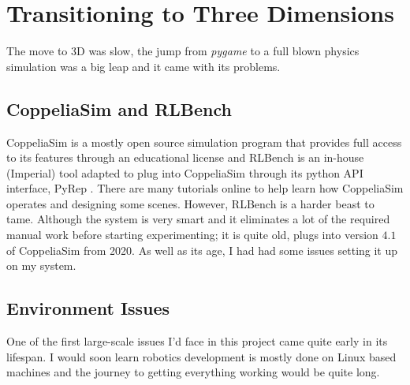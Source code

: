 \section{Transitioning to Three Dimensions}
The move to 3D was slow, the jump from \emph{pygame} to a full blown physics simulation was a big leap and it came with its problems.

\subsection{CoppeliaSim and RLBench}

CoppeliaSim is a mostly open source simulation program that provides full access to its features through an educational license and RLBench \cite{james2019rlbenchrobotlearningbenchmark} is an in-house (Imperial) tool adapted to plug into CoppeliaSim through its python API interface, PyRep \cite{pyrep2020}. There are many tutorials online to help learn how CoppeliaSim operates and designing some scenes. However, RLBench is a harder beast to tame. Although the system is very smart and it eliminates a lot of the required manual work before starting experimenting; it is quite old, plugs into version $4.1$ of CoppeliaSim from 2020. As well as its age, I had had some issues setting it up on my system. 

\subsection{Environment Issues}
One of the first large-scale issues I'd face in this project came quite early in its lifespan. I would soon learn robotics development is mostly done on Linux based machines and the journey to getting everything working would be quite long.

